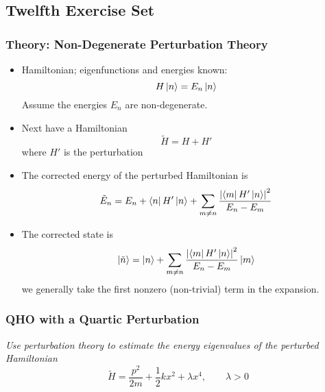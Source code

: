 \documentclass[11pt, a4paper]{article}
\renewcommand{\t}[1]{\tilde{#1}}
\begin{document}
\iffalse
\subsection{Twelfth Exercise Set}

\subsubsection{Theory: Non-Degenerate Perturbation Theory}

\begin{itemize}
	\item Hamiltonian; eigenfunctions and energies known:
	\begin{equation*}
		H \ket{n} = E_{n} \ket{n}
	\end{equation*}
	Assume the energies $ E_{n} $ are non-degenerate.
	
	\item Next have a Hamiltonian
	\begin{equation*}
		\t{H} = H + H'
	\end{equation*}
	where $ H' $ is the perturbation
	
	\item The corrected energy of the perturbed Hamiltonian is
	\begin{equation*}
		\t{E}_{n} = E_{n} + \bra{n}H'\ket{n} + \sum_{m\neq n}\frac{\abs{\bra{m}H'\ket{n}}^{2}}{E_{n}-E_{m}}
	\end{equation*}
	
	\item The corrected state is
	\begin{equation*}
		\ket{\t{n}} = \ket{n} + \sum_{m\neq n}\frac{\abs{\bra{m}H'\ket{n}}^{2}}{E_{n}-E_{m}} \ket{m}
	\end{equation*}
	we generally take the first nonzero (non-trivial) term in the expansion.

\end{itemize}

\subsubsection{QHO with a Quartic Perturbation}
\textit{Use perturbation theory to estimate the energy eigenvalues of the perturbed Hamiltonian}
\begin{equation*}
	\t{H} = \frac{p^{2}}{2m} + \frac{1}{2}kx^{2} + \lambda x^{4}, \qquad \lambda > 0
\end{equation*}
\end{document}

